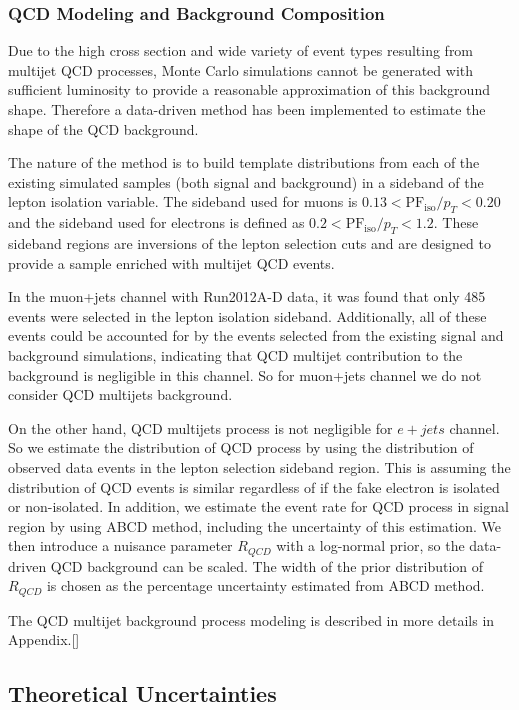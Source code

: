 \documentclass{cmspaperpdf}
\begin{document}
\subsubsection{QCD Modeling and Background Composition}

Due to the high cross section and wide variety of event types resulting from multijet QCD processes, Monte Carlo simulations cannot be generated with sufficient luminosity to provide a reasonable approximation of this background shape. Therefore a data-driven method has been implemented to estimate the shape of the QCD background.

The nature of the method is to build template distributions from each of the existing simulated samples (both signal and background) in a sideband of the lepton isolation variable. The sideband used for muons is $0.13<\mathrm{PF}_\mathrm{iso}/p_{T}<0.20$ and the sideband used for electrons is defined as  $0.2<\mathrm{PF}_\mathrm{iso}/p_{T}<1.2$. These sideband regions are inversions of the lepton selection cuts and are designed to provide a sample enriched with multijet QCD events.

In the muon+jets channel with Run2012A-D data, it was found that only 485 events were selected in the lepton isolation sideband. Additionally, all of these events could be accounted for by the events selected from the existing signal and background simulations, indicating that QCD multijet contribution to the background is negligible in this channel. So for muon+jets channel we do not consider QCD multijets background.

On the other hand, QCD multijets process is not negligible for $e+jets$ channel. So we estimate the distribution of QCD process by using the distribution of observed data events in the lepton selection sideband region. This is assuming the distribution of QCD events is similar regardless of if the fake electron is isolated or non-isolated. In addition, we estimate the event rate for QCD process in signal region by using ABCD method, including the uncertainty of this estimation. We then introduce a nuisance parameter $R_{QCD}$ with a log-normal prior, so the data-driven QCD background can be scaled. The width of the prior distribution of $R_{QCD}$ is chosen as the percentage uncertainty estimated from ABCD method. 

The QCD multijet background process modeling is described in more details in Appendix.[]

\subsection{Theoretical Uncertainties}
\end{document}
